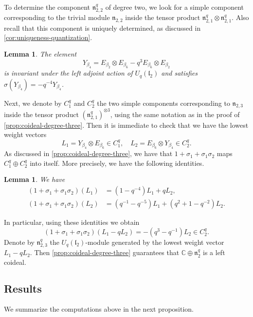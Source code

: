 \documentclass[a4paper, 12pt, reqno, english]{amsart}
\numberwithin{equation}{section}
\numberwithin{figure}{section}
\theoremstyle{plain}
\theoremstyle{plain}
\theoremstyle{plain}
\theoremstyle{plain}
\newtheorem{lemma}[theorem]{Lemma}
\theoremstyle{plain}
\theoremstyle{definition}
\theoremstyle{definition}
\theoremstyle{definition}
\theoremstyle{remark}
\theoremstyle{definition}
\theoremstyle{definition}
\newcommand{\bbC}{\mathbb{C}}
\newcommand{\liel}{\mathfrak{l}}
\newcommand{\lien}{\mathfrak{n}}
\newcommand{\qnil}{\lien^q}
\begin{document}
To determine the component $\qnil_{2, 2}$ of degree two, we look for a simple component corresponding to the trivial module $\lien_{2, 2}$ inside the tensor product $\qnil_{2, 1} \otimes \qnil_{2, 1}$.
Also recall that this component is uniquely determined, as discussed in \cref{cor:uniqueness-quantization}.

\begin{lemma}
The element
\[
Y_{\beta_4} = E_{\beta_2} \otimes E_{\beta_6} - q^3 E_{\beta_6} \otimes E_{\beta_2}
\]
is invariant under the left adjoint action of $U_q(\liel_2)$ and satisfies $\sigma(Y_{\beta_4}) = -q^{-4} Y_{\beta_4}$.
\end{lemma}

Next, we denote by $C^q_1$ and $C^q_2$ the two simple components corresponding to $\lien_{2, 3}$ inside the tensor product $(\qnil_{2, 1})^{\otimes 3}$, using the same notation as in the proof of \cref{prop:coideal-degree-three}.
Then it is immediate to check that we have the lowest weight vectors
\[
L_1 = Y_{\beta_4} \otimes E_{\beta_6} \in C^q_1, \quad
L_2 = E_{\beta_6} \otimes Y_{\beta_4} \in C^q_2.
\]
As discussed in \cref{prop:coideal-degree-three}, we have that $1 + \sigma_1 + \sigma_1 \sigma_2$ maps $C^q_1 \oplus C^q_2$ into itself.
More precisely, we have the following identities.

\begin{lemma}
We have
\[
\begin{split}
(1 + \sigma_1 + \sigma_1 \sigma_2) (L_1) & = (1 - q^{-4}) L_1 + q L_2, \\
(1 + \sigma_1 + \sigma_1 \sigma_2) (L_2) & = (q^{-1} - q^{-5}) L_1 + (q^2 + 1 - q^{-2}) L_2.
\end{split}
\]
\end{lemma}

In particular, using these identities we obtain
\[
(1 + \sigma_1 + \sigma_1 \sigma_2) (L_1 - q L_2) = - (q^3 - q^{-1}) L_2 \in C^q_2.
\]
Denote by $\qnil_{2, 3}$ the $U_q(\liel_2)$-module generated by the lowest weight vector $L_1 - q L_2$.
Then \cref{prop:coideal-degree-three} guarantees that $\bbC \oplus \qnil_2$ is a left coideal.

\subsection{Results}

We summarize the computations above in the next proposition.
\end{document}
